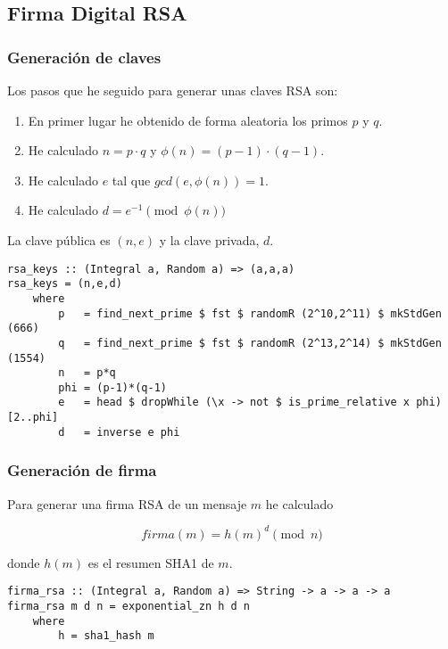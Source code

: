 \documentclass[10pt,spanish]{article}
\begin{document}
\subsection{\textcolor{azul}Firma Digital RSA}
\subsubsection{\textcolor{azul}Generación de claves}
Los pasos que he seguido para generar unas claves RSA son:

\begin{enumerate}
    \item En primer lugar he obtenido de forma aleatoria los primos $p$ y $q$.
    \item He calculado $n = p \cdot q$ y $\phi (n) = (p-1)\cdot (q-1)$.
    \item He calculado $e$ tal que $gcd(e,\phi (n)) = 1$.
    \item He calculado $d = e^{-1} \pmod{\phi (n)}$
\end{enumerate}

La clave pública es $(n,e)$ y la clave privada, $d$.

\begin{verbatim}
rsa_keys :: (Integral a, Random a) => (a,a,a)
rsa_keys = (n,e,d)
    where
        p   = find_next_prime $ fst $ randomR (2^10,2^11) $ mkStdGen (666)
        q   = find_next_prime $ fst $ randomR (2^13,2^14) $ mkStdGen (1554)
        n   = p*q
        phi = (p-1)*(q-1)
        e   = head $ dropWhile (\x -> not $ is_prime_relative x phi) [2..phi]
        d   = inverse e phi
\end{verbatim}

\subsubsection{\textcolor{azul}Generación de firma}
Para generar una firma RSA de un mensaje $m$ he calculado 

\begin{displaymath}
    firma(m) = h(m)^d \pmod{n}
\end{displaymath}

donde $h(m)$ es el resumen SHA1 de $m$.

\begin{verbatim}
firma_rsa :: (Integral a, Random a) => String -> a -> a -> a
firma_rsa m d n = exponential_zn h d n
    where
        h = sha1_hash m
\end{verbatim}
\end{document}
